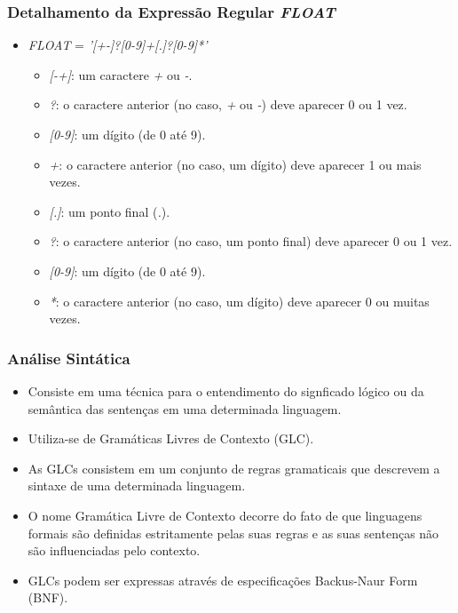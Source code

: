\documentclass[aspectratio=169]{beamer}
\begin{document}
{  \begin{frame}
    \frametitle{Detalhamento da Expressão Regular \emph{FLOAT}}
    \begin{itemize}
      \item \emph{FLOAT} = \emph{'[+-]?[0-9]+[.]?[0-9]*'}
        \begin{itemize}
          \item \emph{[-+]}: um caractere \emph{+} ou \emph{-}.
          \item \emph{?}: o caractere anterior (no caso, \emph{+} ou \emph{-}) deve aparecer 0 ou 1 vez.
          \item \emph{[0-9]}: um dígito (de 0 até 9).
          \item \emph{+}: o caractere anterior (no caso, um dígito) deve aparecer 1 ou mais vezes.
          \item \emph{[.]}: um ponto final (\emph{.}).
          \item \emph{?}: o caractere anterior (no caso, um ponto final) deve aparecer 0 ou 1 vez.
          \item \emph{[0-9]}: um dígito (de 0 até 9).
          \item \emph{*}: o caractere anterior (no caso, um dígito) deve aparecer 0 ou muitas vezes.
      \end{itemize}
    \end{itemize}
\end{frame}


\begin{frame}
  \frametitle{Análise Sintática}

  \begin{itemize}
    \item Consiste em uma técnica para o entendimento do signficado lógico
          ou da semântica das sentenças em uma determinada linguagem.
    \item Utiliza-se de Gramáticas Livres de Contexto (GLC).
    \item As GLCs consistem em um conjunto de regras gramaticais que 
          descrevem a sintaxe de uma determinada linguagem.
    \item O nome Gramática Livre de Contexto decorre do fato de que 
          linguagens formais s\~ao definidas estritamente pelas suas 
          regras e as suas senten\c cas n\~ao s\~ao influenciadas pelo 
          contexto.
    \item GLCs podem ser expressas através de especificações Backus-Naur 
          Form (BNF).
  \end{itemize}


\end{frame}}
\end{document}
